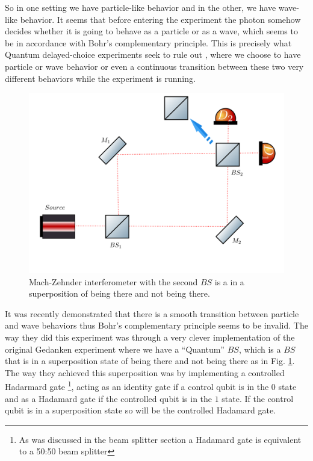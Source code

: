 \documentclass{book}
\begin{document}
So in one setting we have particle-like behavior and in the other, we have wave-like behavior. It seems that before entering the experiment the photon somehow decides whether it is going to behave as a particle or as a wave, which seems to be in accordance with Bohr's complementary principle. This is precisely what Quantum delayed-choice experiments seek to rule out \cite{Ma}, where we choose to have particle or wave behavior or even a continuous transition between these two very different behaviors while the experiment is running.

\begin{figure}[H]
\centering
\includegraphics[width=\linewidth,height=7.5 cm]{images/wheeler3.png}
\caption{Mach-Zehnder interferometer with the second $BS$ is a in a superposition of being there and not being there.}
\label{wheeler3}
\end{figure}

It was recently demonstrated \cite{Peruzzo, Kaiser2012} that there is a smooth transition between particle and wave behaviors thus Bohr's complementary principle seems to be invalid. The way they did this experiment was through a very clever implementation of the original Gedanken experiment where we have a ``Quantum'' $BS$, which is a $BS$ that is in a superposition state of being there and not being there as in Fig. \ref{wheeler3}. The way they achieved this superposition was by implementing a controlled Hadarmard gate \footnote{As was discussed in the beam splitter section a Hadamard gate is equivalent to a 50:50 beam splitter}, acting as an identity gate if a control qubit is in the $0$ state and as a Hadamard gate if the controlled qubit is in the $1$ state.  If the control qubit is in a superposition state so will be the controlled Hadamard gate.
\end{document}
